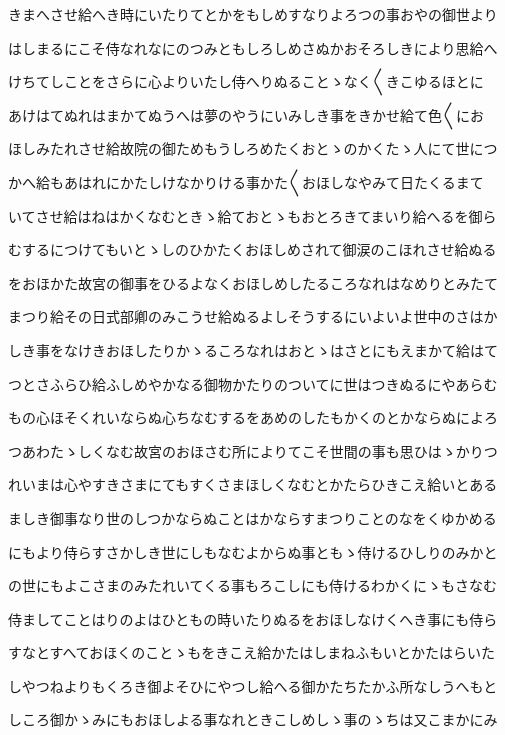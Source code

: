\documentclass[a4paper,11pt,landscape]{ltjtarticle}
\begin{document}
きまへさせ給へき時にいたりてとかをもしめすなりよろつの事おやの御世より
\par\medskip
はしまるにこそ侍なれなにのつみともしろしめさぬかおそろしきにより思給へ
\par\medskip
けちてしことをさらに心よりいたし侍へりぬることゝなく〱きこゆるほとに
\par\medskip
あけはてぬれはまかてぬうへは夢のやうにいみしき事をきかせ給て色〱にお
\par\medskip
ほしみたれさせ給故院の御ためもうしろめたくおとゝのかくたゝ人にて世につ
\par\medskip
かへ給もあはれにかたしけなかりける事かた〱おほしなやみて日たくるまて
\par\medskip
いてさせ給はねはかくなむときゝ給ておとゝもおとろきてまいり給へるを御ら
\par\medskip
むするにつけてもいとゝしのひかたくおほしめされて御涙のこほれさせ給ぬる
\par\medskip
をおほかた故宮の御事をひるよなくおほしめしたるころなれはなめりとみたて
\par\medskip
まつり給その日式部卿のみこうせ給ぬるよしそうするにいよいよ世中のさはか
\par\medskip
しき事をなけきおほしたりかゝるころなれはおとゝはさとにもえまかて給はて
\par\medskip
つとさふらひ給ふしめやかなる御物かたりのついてに世はつきぬるにやあらむ
\par\medskip
もの心ほそくれいならぬ心ちなむするをあめのしたもかくのとかならぬによろ
\par\medskip
つあわたゝしくなむ故宮のおほさむ所によりてこそ世間の事も思ひはゝかりつ
\par\medskip
れいまは心やすきさまにてもすくさまほしくなむとかたらひきこえ給いとある
\par\medskip
ましき御事なり世のしつかならぬことはかならすまつりことのなをくゆかめる
\par\medskip
にもより侍らすさかしき世にしもなむよからぬ事ともゝ侍けるひしりのみかと
\par\medskip
の世にもよこさまのみたれいてくる事もろこしにも侍けるわかくにゝもさなむ
\par\medskip
侍ましてことはりのよはひともの時いたりぬるをおほしなけくへき事にも侍ら
\par\medskip
すなとすへておほくのことゝもをきこえ給かたはしまねふもいとかたはらいた
\par\medskip
しやつねよりもくろき御よそひにやつし給へる御かたちたかふ所なしうへもと
\par\medskip
しころ御かゝみにもおほしよる事なれときこしめしゝ事のゝちは又こまかにみ
\end{document}
